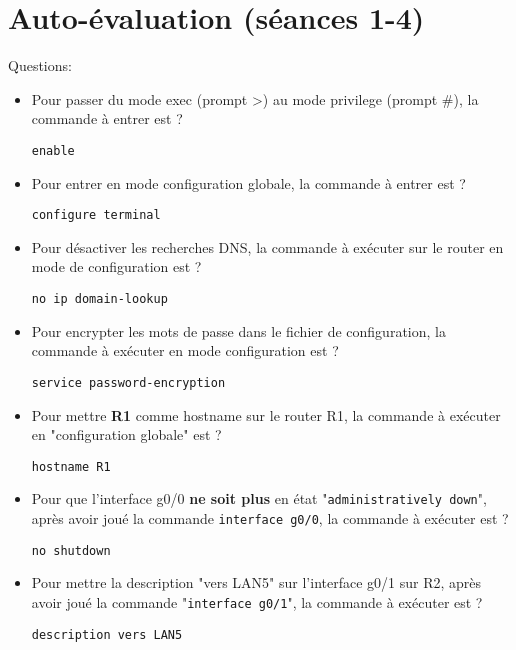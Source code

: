 \documentclass[a4paper]{article}
\begin{document}
\newpage \section{Auto-évaluation (séances 1-4)}





Questions:
\begin{itemize}
    \item Pour passer du mode exec (prompt >) au mode privilege (prompt \#), la commande à entrer est ?
    \begin{example}
        \texttt{enable}
    \end{example}
    \item Pour entrer en mode configuration globale, la commande à entrer est ?
    \begin{example}
        \texttt{configure terminal}
    \end{example}
    \item Pour désactiver les recherches DNS, la commande à exécuter sur le router en mode de configuration est ?
    \begin{example}
        \texttt{no ip domain-lookup}
    \end{example}
    \item Pour encrypter les mots de passe dans le fichier de configuration, la commande à exécuter en mode configuration est ?
    \begin{example}
        \texttt{service password-encryption}
    \end{example}
    \item Pour mettre \textbf{R1} comme hostname sur le router R1, la commande à exécuter en "configuration globale" est ?
    \begin{example}
        \texttt{hostname R1}
    \end{example}
    \item Pour que l'interface g0/0 \textbf{ne soit plus} en état "\texttt{administratively down}", après avoir joué la commande \texttt{interface g0/0}, la commande à exécuter est ?
    \begin{example}
        \texttt{no shutdown}
    \end{example}
    \item Pour mettre la description "vers LAN5" sur l'interface g0/1 sur R2, après avoir joué la commande "\texttt{interface g0/1}", la commande à exécuter est ?
    \begin{example}
        \texttt{description vers LAN5}
    \end{example}

\end{itemize}
\end{document}
